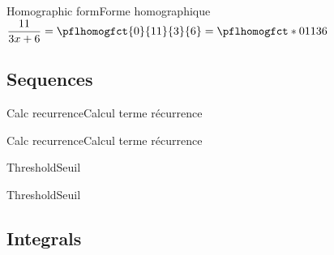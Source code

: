 \documentclass[a4paper,english,11pt]{article}
\begin{document}
\begin{myprestex}{Homographic form}{Forme homographique}
$\dfrac{11}{3x+6} =
\pflhomogfct{0}{11}{3}{6} = \pflhomogfct*{0}{11}{3}{6}$
\end{myprestex}

\subsection{Sequences}

\begin{myprestexcode}{Calc recurrence}{Calcul terme récurrence}

\end{myprestexcode}

\begin{myprestex}{Calc recurrence}{Calcul terme récurrence}
\end{myprestex}

\begin{myprestexcode}{Threshold}{Seuil}

\end{myprestexcode}

\begin{myprestex}{Threshold}{Seuil}
\end{myprestex}

\subsection{Integrals}
\end{document}
